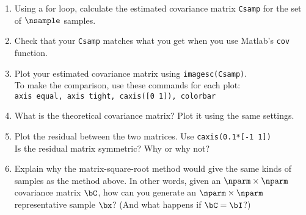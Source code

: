 \documentclass[11pt,titlepage,fleqn]{article}
\begin{document}
\begin{enumerate}
\item Using a for loop, calculate the estimated covariance matrix \verb+Csamp+ for the set of $\nsample$ samples.

\item Check that your \verb+Csamp+ matches what you get when you use Matlab's \verb+cov+ function.

\item Plot your estimated covariance matrix using \verb+imagesc(Csamp)+. \\
To make the comparison, use these commands for each plot: \\
\verb+axis equal, axis tight, caxis([0 1]), colorbar+

\item What is the theoretical covariance matrix? Plot it using the same settings.

\item Plot the residual between the two matrices. Use \verb+caxis(0.1*[-1 1])+ \\
Is the residual matrix symmetric? Why or why not?

\item Explain why the matrix-square-root method would give the same kinds of samples as the method above. In other words, given an $\nparm \times \nparm$ covariance matrix $\bC$, how can you generate an $\nparm \times \nparm$ representative sample $\bx$? (And what happens if $\bC = \bI$?)

\end{enumerate}

\end{document}
